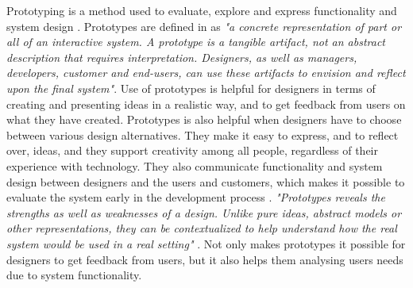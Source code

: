 Prototyping is a method used to evaluate, explore and express functionality and system design \cite{houde1997prototypes}. Prototypes are defined in \cite{mackayprototyping} as \emph{"a concrete representation of part or all of an interactive system. A prototype is a tangible artifact, not an abstract description that requires interpretation. Designers, as well as managers, developers, customer and end-users, can use these artifacts to envision and reflect upon the final system"}. Use of prototypes is helpful for designers in terms of creating and presenting ideas in a realistic way, and to get feedback from users on what they have created. Prototypes is also helpful when designers have to choose between various design alternatives. They make it easy to express, and to reflect over, ideas, and they support creativity among all people, regardless of their experience with technology. They also communicate functionality and system design between designers and the users and customers, which makes it possible to evaluate the system early in the development process \cite{mackayprototyping} \cite{mmi}. \emph{"Prototypes reveals the strengths as well as weaknesses of a design. Unlike pure ideas, abstract models or other representations, they can be contextualized to help understand how the real system would be used in a real setting"} \cite{mackayprototyping}. Not only makes prototypes it possible for designers to get feedback from users, but it also helps them analysing users needs due to system functionality. 

